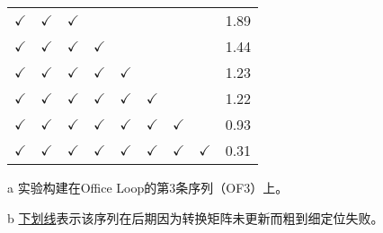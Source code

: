 \begin{table}
\begin{threeparttable}
\begin{tabular}{ccccccccc}
$\checkmark$ & $\checkmark$                                     &$\checkmark$                                                   &                                                 &                                                   &                                                  &                                                   &                                                 & 1.89 \\
$\checkmark$ & $\checkmark$                                     &$\checkmark$                                                   & $\checkmark$                                    &                                                   &                                                  &                                                   &                                                 & 1.44       \\
$\checkmark$ & $\checkmark$                                     &$\checkmark$                                                   & $\checkmark$                                    & $\checkmark$                                      &                                                  &                                                   &                                                 & 1.23       \\
$\checkmark$ & $\checkmark$                                     &$\checkmark$                                                   & $\checkmark$                                    & $\checkmark$                                      & $\checkmark$                                     &                                                   &                                                 & 1.22       \\
$\checkmark$ & $\checkmark$                                     &$\checkmark$                                                   & $\checkmark$                                    & $\checkmark$                                      & $\checkmark$                                     & $\checkmark$                                      &                                                 & 0.93       \\
$\checkmark$ & $\checkmark$                                     &$\checkmark$                                                   & $\checkmark$                                    & $\checkmark$                                      & $\checkmark$                                     & $\checkmark$                                      & $\checkmark$                                    & 0.31       \\ \bottomrule
\end{tabular}
\label{tab:loc_ablation}
\begin{tablenotes}
  \item [a] 实验构建在Office Loop的第3条序列（OF3）上。
  \item [b] \underline{下划线}表示该序列在后期因为转换矩阵未更新而粗到细定位失败。
\end{tablenotes}
\end{threeparttable}
\end{table}

